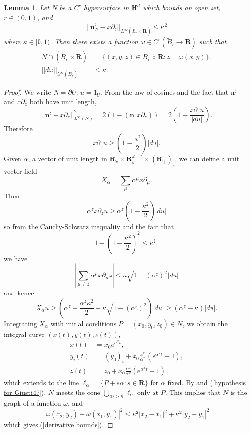 \documentclass[reqno,12pt,letterpaper]{amsart}
\newcommand{\RR}{\mathbf{R}}
\newcommand{\Hyp}{\mathbf H}
\newcommand{\normal}{\mathbf n}
\newtheorem{lemma}[theorem]{Lemma}
\theoremstyle{definition}
\numberwithin{equation}{section}
\begin{document}
\begin{lemma}\label{hopfKilling}
Let $N$ be a $C^r$ hypersurface in $\Hyp^d$ which bounds an open set, $r \in (0, 1)$, and
\begin{equation}\label{kappa-correct alignment}
||\normal_N^\sharp - x\partial_z||_{L^\infty(\tilde B_r \times \RR)} \leq \kappa^2
\end{equation}
where $\kappa \in [0, 1)$.
Then there exists a function $\omega \in C^r(\tilde B_r \to \RR)$
such that
\begin{align}
    N \cap (\tilde B_r \times \RR) &= \{(x, y, z) \in \tilde B_r\times \RR: z = \omega(x, y)\}, \label{N is a graph}\\
    ||d\omega||_{L^\infty(\tilde B_r)} &\leq \kappa. \label{derivative bounds}
\end{align}
\end{lemma}
\begin{proof}
We write $N = \partial U$, $u = 1_U$.
From the law of cosines and the fact that $\normal^\sharp$ and $x\partial_z$ both have unit length,
$$||\normal^\sharp - x\partial_z||_{L^\infty(N)}^2 = 2(1 - (\normal, x\partial_z)) = 2\left(1 - \frac{x\partial_z u}{|du|}\right).$$
Therefore
$$x\partial_z u \geq \left(1 - \frac{\kappa^2}{2}\right) |du|.$$
Given $\alpha$, a vector of unit length in $\RR_x \times \RR^{d - 2}_y \times (\RR_+)_z$, we can define a unit vector field
$$X_\alpha = \sum_\mu \alpha^\mu x\partial_\mu.$$
Then
$$\alpha^z x\partial_z u \geq \alpha^z \left(1 - \frac{\kappa^2}{2}\right) |du|$$
so from the Cauchy-Schwarz inequality and the fact that
$$1 - \left(1 - \frac{\kappa^2}{2}\right)^2 \leq \kappa^2,$$
we have
$$\left|\sum_{\mu \neq z} \alpha^\mu x\partial_\mu z\right| \leq \kappa\sqrt{1 - (\alpha^z)^2} |du|$$
and hence
\begin{equation}\label{hypothesis for Giusti47}
X_\alpha u \geq \left(\alpha^z - \frac{\alpha^z \kappa^2}{2} - \kappa\sqrt{1 - (\alpha^z)^2}\right)|du| \geq (\alpha^z - \kappa)|du|.
\end{equation}
Integrating $X_\alpha$ with initial conditions $P = (x_0, y_0, z_0) \in N$, we obtain the integral curve $(x(t), y(t), z(t))$,
\begin{align*}
x(t) &= x_0 e^{\alpha^x t}, \\
y_i(t) &= (y_0)_i + x_0 \frac{\alpha^{y_i}}{\alpha^x}(e^{\alpha^x t} - 1),\\
z(t) &= z_0 + x_0 \frac{\alpha^z}{\alpha^x}(e^{\alpha^x t} - 1)
\end{align*}
which extends to the line $\ell_\alpha = \{P + s\alpha: s \in \RR\}$ for $\alpha$ fixed.
By \cite[Remark 4.7]{Giusti77} and (\ref{hypothesis for Giusti47}), $N$ meets the cone $\bigcup_{\alpha^z > \kappa} \ell_\alpha$
only at $P$. This implies that $N$ is the graph of a function $\omega$, and
$$|\omega(x_2, y_2) - \omega(x_1, y_1)|^2 \leq \kappa^2 |x_2 - x_1|^2 + \kappa^2 |y_2 - y_1|^2$$
which gives (\ref{derivative bounds}).
\end{proof}
\end{document}
